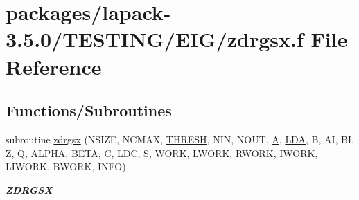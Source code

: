 \hypertarget{zdrgsx_8f}{}\section{packages/lapack-\/3.5.0/\+T\+E\+S\+T\+I\+N\+G/\+E\+I\+G/zdrgsx.f File Reference}
\label{zdrgsx_8f}
\subsection*{Functions/\+Subroutines}
\begin{DoxyCompactItemize}
\item 
subroutine \hyperlink{group__complex16__eig_gaf81dc11e477868381fba4cb8f61904ab}{zdrgsx} (N\+S\+I\+Z\+E, N\+C\+M\+A\+X, \hyperlink{zlaqgs_8c_a0656018abfc9fa2821827415f5d5ea57}{T\+H\+R\+E\+S\+H}, N\+I\+N, N\+O\+U\+T, \hyperlink{classA}{A}, \hyperlink{example__user_8c_ae946da542ce0db94dced19b2ecefd1aa}{L\+D\+A}, B, A\+I, B\+I, Z, Q, A\+L\+P\+H\+A, B\+E\+T\+A, C, L\+D\+C, S, W\+O\+R\+K, L\+W\+O\+R\+K, R\+W\+O\+R\+K, I\+W\+O\+R\+K, L\+I\+W\+O\+R\+K, B\+W\+O\+R\+K, I\+N\+F\+O)
\begin{DoxyCompactList}\small\item\em {\bfseries Z\+D\+R\+G\+S\+X} \end{DoxyCompactList}\end{DoxyCompactItemize}
